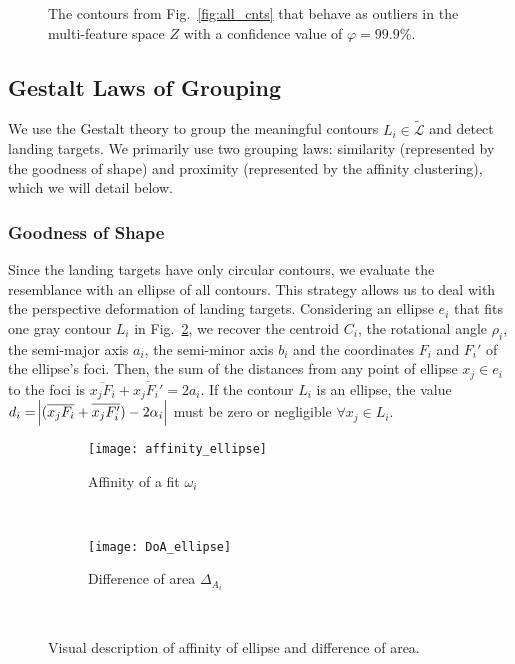 \begin{figure}[!ht]
    \centering
    \caption{The contours from Fig.\ \ref{fig:all_cnts} that behave as outliers in the multi-feature space $Z$ with a confidence value of $\varphi=99.9\%$.}
    \label{fig:rx_cnts}
\end{figure}

\subsection{Gestalt Laws of Grouping}\label{subsec:Gestalt}
We use the Gestalt theory \citep{Wertheimer:Psycologische:1923} to group the meaningful contours $L_{i}\in \widetilde{\mathcal{L}}$ and detect landing targets. We primarily use two grouping laws: similarity (represented by the goodness of shape) and proximity (represented by the affinity clustering), which we will detail below.

\subsubsection{Goodness of Shape}\label{subsec:similarity}
Since the landing targets have only circular contours, we evaluate the resemblance with an ellipse of all contours. This strategy allows us to deal with the perspective deformation of landing targets. Considering an ellipse $e_{i}$ that fits one gray contour $L_{i}$ in Fig.\ \ref{fig:affinity}, we recover the centroid $C_{i}$, the rotational angle $\rho_i$, the semi-major axis $a_i$, the semi-minor axis $b_i$ and the coordinates $F_{i}$ and $F_{i}'$ of the ellipse's foci. Then, the sum of the distances from any point of ellipse $x_{j}\in e_{i}$ to the foci is $\overline{x_{j}F_{i}}+\overline{x_{j}F_{i}'}=2a_{i}$. If the contour $L_{i}$ is an ellipse, the value $d_{i}=\abs{(\overline{x_{j}F_{i}}+\overline{x_{j}F_{i}'})-2\alpha_{i} }$ must be zero or negligible $\forall x_{j}\in L_{i}$. 

\begin{figure}[ht]
    \centering
    \begin{subfigure}[b]{0.45\textwidth}
        \texttt{[image: affinity\_ellipse]}
        \caption{Affinity of a fit $\omega_{i}$}
        \label{fig:affinity}
    \end{subfigure}
    ~ %
    \begin{subfigure}[b]{0.5\textwidth}
        \texttt{[image: DoA\_ellipse]}
        \caption{Difference of area $\Delta_{A_{i}}$}
        \label{fig:DoA}
    \end{subfigure}\\
    \caption{Visual description of affinity of ellipse and difference of area.}\label{fig:ressemblance_ellipse}
\end{figure}


